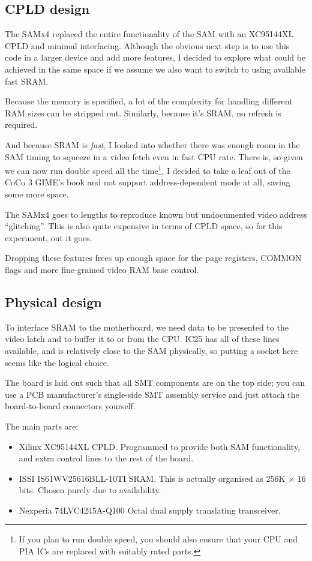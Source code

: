 \documentclass[12pt]{article}
\begin{document}
\newpage
\subsection*{CPLD design}

The SAMx4 replaced the entire functionality of the SAM with an XC95144XL CPLD
and minimal interfacing.  Although the obvious next step is to use this code in
a larger device and add more features, I decided to explore what could be
achieved in the same space if we assume we also want to switch to using
available fast SRAM.

Because the memory is specified, a lot of the complexity for handling different
RAM sizes can be stripped out.  Similarly, because it's SRAM, no refresh is
required.

And because SRAM is \textit{fast}, I looked into whether there was enough
room in the SAM timing to squeeze in a video fetch even in fast CPU rate.
There is, so given we can now run double speed all the time\footnote{If you
plan to run double speed, you should also ensure that your CPU and PIA ICs are
replaced with suitably rated parts.}, I decided to take a leaf out of the CoCo 3
GIME's book and not support address-dependent mode at all, saving some more
space.

The SAMx4 goes to lengths to reproduce known but undocumented video address
``glitching''.  This is also quite expensive in terms of CPLD space, so for
this experiment, out it goes.

Dropping these features frees up enough space for the page registers, COMMON
flags and more fine-grained video RAM base control.


\subsection*{Physical design}

To interface SRAM to the motherboard, we need data to be presented to the video
latch and to buffer it to or from the CPU.  IC25 has all of these lines
available, and is relatively close to the SAM physically, so putting a socket
here seems like the logical choice.

The board is laid out such that all SMT components are on the top side; you can
use a PCB manufacturer's single-side SMT assembly service and just attach the
board-to-board connectors yourself.

The main parts are:

\begin{itemize} \item Xilinx XC95144XL CPLD.  Programmed to provide both SAM
functionality, and extra control lines to the rest of the board.

\item ISSI IS61WV25616BLL-10TI SRAM.  This is actually organised as 256K × 16 bits.
Chosen purely due to availability.

\item Nexperia 74LVC4245A-Q100 Octal dual supply translating transceiver.
\end{itemize}
\end{document}
